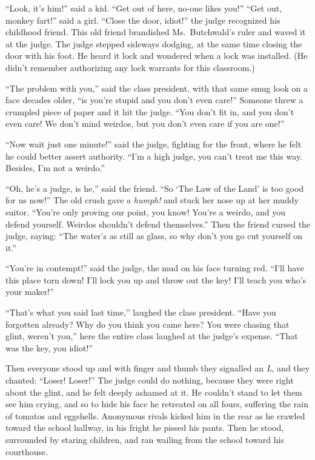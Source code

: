 \documentclass[oneside]{book}
\begin{document}
``Look, it's him!'' said a kid.  ``Get out of here, no-one likes you!''  ``Get out, monkey fart!''
said a girl.  ``Close the door, idiot!'' the judge recognized his childhood friend.  This old
friend brandished Ms.~Butchwald's ruler and waved it at the judge.  The judge stepped sideways
dodging, at the same time closing the door with his foot.  He heard it lock and wondered
when a lock was installed.  (He didn't remember authorizing any lock warrants for this classroom.)

``The problem with you,'' said the class president, with that same smug look on a face decades
older, ``is you're stupid and you don't even care!''  Someone threw a crumpled piece of paper and
it hit the judge.  ``You don't fit in, and you don't even care!  We don't mind weirdos, but
you don't even care if you are one!''

``Now wait just one minute!'' said the judge, fighting for the front, where he
felt he could better assert authority.  ``I'm a high judge, you can't treat me this way.  Besides,
I'm not a weirdo.''

``Oh, he's a judge, is he,'' said the friend.  ``So `The Law of the Land' is too good for us now!''
The old crush gave a \emph{humph!} and stuck her nose up at her muddy suitor.  ``You're only
proving our point, you know!  You're a weirdo, and you defend yourself.  Weirdos shouldn't
defend themselves.''  Then the friend cursed the judge, saying: ``The water's as still as glass, so why don't
you go cut yourself on it.''

``You're in contempt!'' said the judge, the mud on his face turning red.  ``I'll have this
place torn down!  I'll lock you up and throw out the key!  I'll teach you who's your
maker!''

``That's what you said last time,'' laughed the class president.  ``Have you forgotten already?
Why do you think you came here?  You were chasing that glint, weren't you,'' here the entire
class laughed at the judge's expense.  ``That was the key, you idiot!''

Then everyone stood up and with finger and thumb they signalled an \emph{L}, and they chanted:
``Loser!  Loser!''  The judge could do nothing, because they were right about the glint, and he
felt deeply ashamed at it.  He couldn't stand to let them see him crying, and so to hide his
face he retreated on all fours, suffering the rain of tomatos and eggshells.  Anonymous rivals kicked
him in the rear as he crawled toward the school hallway, in his fright he pissed his pants.
Then he stood, surrounded by staring children, and ran wailing from the school toward his
courthouse.
\end{document}
